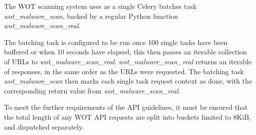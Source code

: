 The WOT scanning system uses as a single Celery batches task \emph{wot_malware_scan}, backed by a regular Python function \emph{wot_malware_scan_real}.

The batching task is configured to be run once 100 single tasks have been buffered or when 10 seconds have elapsed, this then passes an iterable collection of URLs to \emph{wot_malware_scan_real}. \emph{wot_malware_scan_real} returns an iterable of responses, in the same order as the URLs were requested. The batching task \emph{wot_malware_scan} then marks each single task request context as done, with the corresponding return value from \emph{wot_malware_scan_real}\cite{celery-batches}.

To meet the further requirements of the API guidelines, it must be ensured that the total length of any WOT API requests are split into buckets limited to 8KiB, and dispatched separately.



